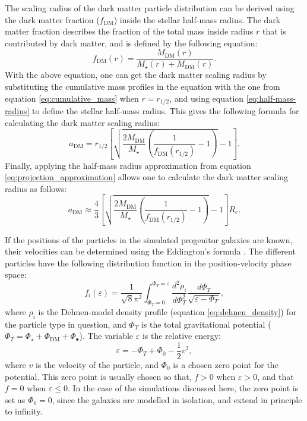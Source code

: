 \documentclass[english, twoside]{HYgradu}
\begin{document}
The scaling radius of the dark matter particle distribution can be derived using the dark matter fraction ($f_{\mathrm{DM}}$) inside the stellar half-mass radius. The dark matter fraction describes the fraction of the total mass inside radius $r$ that is contributed by dark matter, and is defined by the following equation:
\begin{equation}
f_\mathrm{DM}(r) = \frac{M_\mathrm{DM}(r)}{M_\star(r) + M_\mathrm{DM}(r)}. \label{eq:dm_fraction}
\end{equation}
With the above equation, one can get the dark matter scaling radius by substituting the cumulative mass profiles in the equation with the one from equation \ref{eq:cumulative_mass} when $r=r_{1/2}$, and using equation \ref{eq:half-mass-radius} to define the stellar half-mass radius. This gives the following formula for calculating the dark matter scaling radius:
\begin{equation}
a_\mathrm{DM} =  r_\mathrm{1/2} \left[ \sqrt{\frac{2M_\mathrm{DM}}{M_\star} \left( \frac{1}{f_\mathrm{DM}(r_{1/2})} - 1 \right)} -1 \right].
\end{equation}
Finally, applying the half-mass radius approximation from equation \ref{eq:projection_approximation} allows one to calculate the dark matter scaling radius as follows:
\begin{equation}
a_\mathrm{DM} \approx \frac{4}{3} \left[ \sqrt{\frac{2M_\mathrm{DM}}{M_\star} \left( \frac{1}{f_\mathrm{DM}(r_{1/2})} - 1 \right)} -1 \right] R_e.
\end{equation}

If the positions of the particles in the simulated progenitor galaxies are known, their velocities can be determined using the Eddington's formula \citep{BinneyTremaine}. The different particles have the following distribution function in the position-velocity phase space:
\begin{equation}
f_i(\varepsilon) = \frac{1}{\sqrt{8}\pi^2} \int^{\Phi_T = \varepsilon}_{\Phi_T = 0} \frac{d^2\rho_i}{d\Phi^2_T}
\frac{d\Phi_T}{\sqrt{\varepsilon - \Phi_T}}, \label{eq:eddington_form}
\end{equation}
where $\rho_i$ is the Dehnen-model density profile (equation \ref{eq:dehnen_density}) for the particle type in question, and $\Phi_T$ is the total gravitational potential ($\Phi_T = \Phi_\star + \Phi_\mathrm{DM} + \Phi_\bullet$). The variable $\varepsilon$ is the relative energy:
\begin{equation}
\varepsilon = -\Phi_T + \Phi_0 - \frac{1}{2} v^2,
\end{equation}
where $v$ is the velocity of the particle, and $\Phi_0$ is a chosen zero point for the potential. This zero point is usually chosen so that, $f > 0$ when $\varepsilon > 0$, and that $f = 0$ when $\varepsilon \leq 0$. In the case of the simulations discussed here, the zero point is set as $\Phi_0 = 0$, since the galaxies are modelled in isolation, and extend in principle to infinity.
\end{document}
